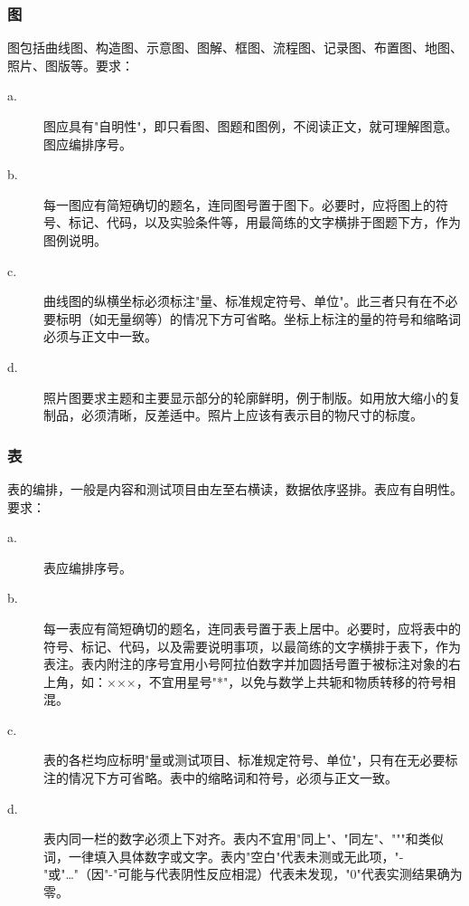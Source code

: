 \subsubsection{图}

图包括曲线图、构造图、示意图、图解、框图、流程图、记录图、布置图、地图、照片、图版等。要求：

\begin{description}

\item[a.] 图应具有"自明性"，即只看图、图题和图例，不阅读正文，就可理解图意。图应编排序号。

\item[b.] 每一图应有简短确切的题名，连同图号置于图下。必要时，应将图上的符号、标记、代码，以及实验条件等，用最简练的文字横排于图题下方，作为图例说明。

\item[c.] 曲线图的纵横坐标必须标注"量、标准规定符号、单位"。此三者只有在不必要标明（如无量纲等）的情况下方可省略。坐标上标注的量的符号和缩略词必须与正文中一致。

\item[d.] 照片图要求主题和主要显示部分的轮廓鲜明，例于制版。如用放大缩小的复制品，必须清晰，反差适中。照片上应该有表示目的物尺寸的标度。

\end{description}


\subsubsection{表}

表的编排，一般是内容和测试项目由左至右横读，数据依序竖排。表应有自明性。要求：

\begin{description}

\item[a.] 表应编排序号。

\item[b.] 每一表应有简短确切的题名，连同表号置于表上居中。必要时，应将表中的符号、标记、代码，以及需要说明事项，以最简练的文字横排于表下，作为表注。表内附注的序号宜用小号阿拉伯数字并加圆括号置于被标注对象的右上角，如：×××，不宜用星号"*"，以免与数学上共轭和物质转移的符号相混。

\item[c.] 表的各栏均应标明"量或测试项目、标准规定符号、单位"，只有在无必要标注的情况下方可省略。表中的缩略词和符号，必须与正文一致。

\item[d.] 表内同一栏的数字必须上下对齐。表内不宜用"同上"、"同左"、"""和类似词，一律填入具体数字或文字。表内"空白"代表未测或无此项，"-"或"…"（因"-"可能与代表阴性反应相混）代表未发现，"0"代表实测结果确为零。

\end{description}


